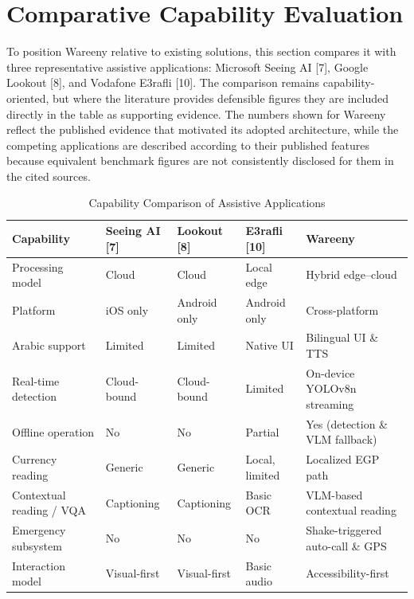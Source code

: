 \documentclass[a4paper]{report}
\begin{document}
\section{Comparative Capability Evaluation}
To position Wareeny relative to existing solutions, this section compares it with three representative assistive applications: Microsoft Seeing AI [7], Google Lookout [8], and Vodafone E3rafli [10]. The comparison remains capability-oriented, but where the literature provides defensible figures they are included directly in the table as supporting evidence. The numbers shown for Wareeny reflect the published evidence that motivated its adopted architecture, while the competing applications are described according to their published features because equivalent benchmark figures are not consistently disclosed for them in the cited sources.

\begin{table}[H]
\centering
\caption{Capability Comparison of Assistive Applications}
\label{tab:capability-comparison}
\begin{tabularx}{\textwidth}{|>{\raggedright\arraybackslash}p{}|>{\raggedright\arraybackslash}p{}|>{\raggedright\arraybackslash}p{}|>{\raggedright\arraybackslash}p{}|>{\raggedright\arraybackslash}X|}
\hline
\textbf{Capability} & \textbf{Seeing AI [7]} & \textbf{Lookout [8]} & \textbf{E3rafli [10]} & \textbf{Wareeny} \\
\hline
Processing model & Cloud & Cloud & Local edge & Hybrid edge--cloud \\
\hline
Platform & iOS only & Android only & Android only & Cross-platform \\
\hline
Arabic support & Limited & Limited & Native UI & Bilingual UI \& TTS \\
\hline
Real-time detection & Cloud-bound & Cloud-bound & Limited & On-device YOLOv8n streaming \\
\hline
Offline operation & No & No & Partial & Yes (detection \& VLM fallback) \\
\hline
Currency reading & Generic & Generic & Local, limited & Localized EGP path \\
\hline
Contextual reading / VQA & Captioning & Captioning & Basic OCR & VLM-based contextual reading \\
\hline
Emergency subsystem & No & No & No & Shake-triggered auto-call \& GPS \\
\hline
Interaction model & Visual-first & Visual-first & Basic audio & Accessibility-first \\
\hline
\end{tabularx}
\end{table}
\end{document}
